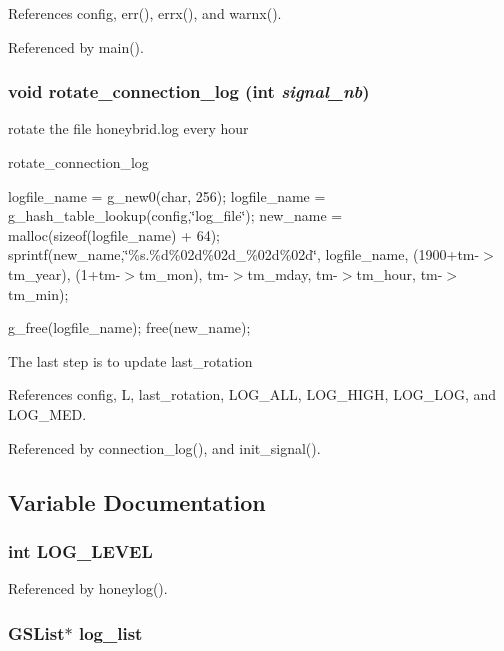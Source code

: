 References config, err(), errx(), and warnx().

Referenced by main().
\subsubsection[{rotate\_\-connection\_\-log}]{\setlength{\rightskip}{0pt plus 5cm}void rotate\_\-connection\_\-log (int {\em signal\_\-nb})}\label{log_8h_25996e403c2f80833b1b8d701826480f}


rotate the file honeybrid.log every hour 

rotate\_\-connection\_\-log 

logfile\_\-name = g\_\-new0(char, 256); logfile\_\-name = g\_\-hash\_\-table\_\-lookup(config,\char`\"{}log\_\-file\char`\"{}); new\_\-name = malloc(sizeof(logfile\_\-name) + 64); sprintf(new\_\-name,\char`\"{}\%s.\%d\%02d\%02d\_\-\%02d\%02d\char`\"{}, logfile\_\-name, (1900+tm-$>$tm\_\-year), (1+tm-$>$tm\_\-mon), tm-$>$tm\_\-mday, tm-$>$tm\_\-hour, tm-$>$tm\_\-min);

g\_\-free(logfile\_\-name); free(new\_\-name);

The last step is to update last\_\-rotation

References config, L, last\_\-rotation, LOG\_\-ALL, LOG\_\-HIGH, LOG\_\-LOG, and LOG\_\-MED.

Referenced by connection\_\-log(), and init\_\-signal().

\subsection{Variable Documentation}
\subsubsection[{LOG\_\-LEVEL}]{\setlength{\rightskip}{0pt plus 5cm}int {\bf LOG\_\-LEVEL}}\label{log_8h_3ecebc9d2fcb9f207a3373191a0ca251}




Referenced by honeylog().
\subsubsection[{log\_\-list}]{\setlength{\rightskip}{0pt plus 5cm}GSList$\ast$ {\bf log\_\-list}}\label{log_8h_0a6c7faf56521863f783c5be3c0a8847}




